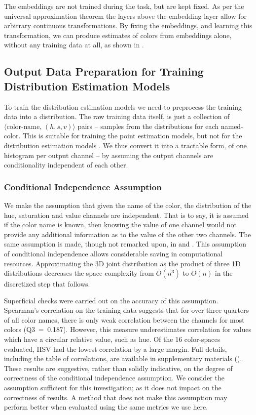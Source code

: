 \documentclass[]{clv3}
\newcommand{\parencite}{\citep}
\newcommand{\textcite}{\citet}
\newcommand{\datapairs}{$\langle\text{color-name},\,(h,s,v)\rangle$}
\begin{document}
The embeddings are not trained during the task, but are kept fixed.
As per the universal approximation theorem \parencite{leshno1993uat, SONODA2017uat} the layers above the embedding layer allow for arbitrary continuous transformations.
By fixing the embeddings, and learning this transformation,
we can produce estimates of colors from embeddings alone, without any training data at all, as shown in .

\subsection{Output Data Preparation for Training Distribution Estimation Models}\label{sec:output-data-preparation}
To train the distribution estimation models we need to preprocess the training data into a distribution.
The raw training data itself, is just a collection of 
 \datapairs{} pairs -- samples from the distributions for each named-color.
This is suitable for training the point estimation models, but not for the distribution estimation models .
We thus convert it into a tractable form, of one histogram per output channel -- by assuming the output channels are conditionality independent of each other.


\subsubsection{Conditional Independence Assumption} \label{sec:conditional-independence-assumption}
We make the assumption that given the name of the color, the distribution of the hue, saturation and value channels are independent.
That is to say, it is assumed if the color name is known, then  knowing the value of one channel would not provide any additional information as to the value of the other two channels.
The same assumption is made, though not remarked upon, in \textcite{meomcmahanstone:color} and \textcite{mcmahan2015bayesian}.
This assumption of conditional independence allows considerable saving in computational resources.
Approximating the 3D joint distribution as the product of three 1D distributions decreases the space complexity from $O(n^3)$ to $O(n)$ in the discretized step that follows.

Superficial checks were carried out on the accuracy of this assumption.
Spearman's correlation on the training data suggests that for over three quarters of all color names, there is only weak correlation between the channels for most colors (\mbox{Q3 = 0.187}).
However, this measure underestimates correlation for values which have a circular relative value, such as hue.
Of the 16 color-spaces evaluated, HSV had the lowest correlation by a large margin.
Full details, including the table of correlations, are available in supplementary materials ().
These results are suggestive, rather than solidly indicative, on the degree of correctness of the conditional independence assumption.
We consider the assumption sufficient for this investigation; as it does not impact on the correctness of results.
A method that does not make this assumption may perform better when evaluated using the same metrics we use here.
\end{document}
